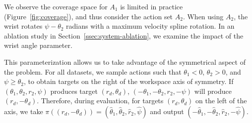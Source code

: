 \documentclass[letterpaper, 10 pt, conference]{ieeeconf}  %
\newcommand{\ba}{\mathbf{a}}
\newcommand{\remark}[3]{{\color{#2}[#1: #3]}}
\newcommand{\raven}[1]{\remark{Raven}{britishracinggreen}{#1}}
\begin{document}

We observe the coverage space for $A_1$ is limited in practice (Figure~\ref{fig:coverage}), and thus consider the action set $A_2$. %
When using $A_2$, the wrist rotates $\psi - \theta_2$ radians with a maximum velocity spline rotation. In an ablation study in Section~\ref{ssec:system-ablation}, we examine the impact of the wrist angle parameter.

This parameterization allows us to take advantage of the symmetrical aspect of the problem. For all datasets, we sample actions such that $\theta_1 < 0$, $\theta_2 > 0$, and $\psi \geq \theta_2$, to obtain targets on the right of the workspace axis of symmetry. If $(\theta_1, \theta_2, r_2, \psi)$ produces target $(r_d, \theta_d)$, $(-\theta_1, -\theta_2, r_2, -\psi)$ will produce $(r_d, -\theta_d)$. Therefore, during evaluation, for targets $(r_d, \theta_d)$ on the left of the axis, we take $\pi((r_d, -\theta_d)) = (\hat{\theta}_1, \hat{\theta}_2, \hat{r}_2, \hat{\psi})$ and output $(-\hat{\theta}_1, -\hat{\theta}_2, \hat{r}_2, -\hat{\psi})$.

\end{document}
